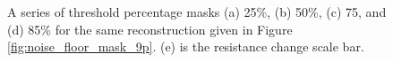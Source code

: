 \begin{figure}[H]
\begin{minipage}[t]{0.3\textwidth}
		\hfill
	\end{minipage} 
	\begin{minipage}[t]{.1\textwidth}
		\vspace{0pt}
		\hfill
	\end{minipage}  
	\caption{A series of threshold percentage masks (a) 25\%, (b) 50\%, (c) 75, and (d) 85\% for the same reconstruction given in Figure \ref{fig:noise_floor_mask_9p}. (e) is the resistance change scale bar.}
	\label{fig:thresh_masks}
\end{figure}

